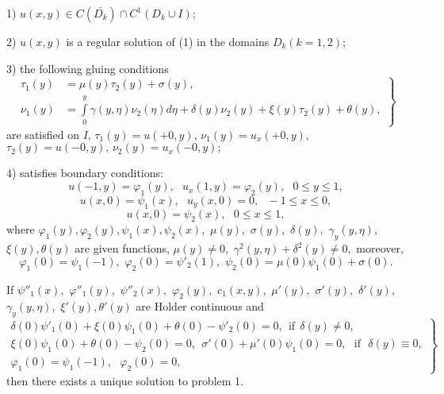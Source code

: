 \documentclass[12pt]{llncs}
\begin{document}
1) $u(x,y)\in C (\bar{D_{k}})\cap C^{1}(D_{k}\cup I)$;

2) $u(x,y)$ is a regular solution of (1) in the domains $D_{k}(k=1,2)$;

3) the following gluing conditions
\begin{equation}
\left.\begin{aligned}
\tau_{1}(y)&=\mu(y)\tau_{2}(y)+\sigma(y),\\
\nu_{1}(y)&=\int\limits_{0}^{y}\gamma(y,\eta)\nu_{2}(\eta)d\eta+\delta(y)\nu_{2}(y)+\xi(y)\tau_{2}(y)+\theta(y),
\end{aligned} \right\}
\end{equation}
are satisfied on $I$, $ \tau_{1}(y)=u(+0,y),\,
\nu_{1}(y)=u_{x}(+0,y), $
$\tau_{2}(y)=u(-0,y),\,\nu_{2}(y)=u_{x}(-0,y); $

4) satisfies boundary conditions:
\begin{equation}
u(-1,y)=\varphi_{1}(y), \ \ \ u_{x}(1,y)=\varphi_{2}(y),\ \ \ 0\leq y\leq 1,
\end{equation}
\begin{equation}
u(x,0)=\psi_{1}(x), \ \ \ u_{y}(x,0)=0,\ \ \ -1\leq x\leq 0,
\end{equation}
\begin{equation}
u(x,0)=\psi_{2}(x),  \ \ \ 0\leq x\leq 1,
\end{equation}
where $ \varphi _1 (y),\varphi _2 (y),\psi _1 (x),\psi _2 (x),$ $
\mu(y),$ $ \sigma(y),$
$  \delta(y),$ $ \gamma_{y}(y,\eta),$ $  \xi(y),  \theta(y) $ are given
functions, $\mu(y)\neq 0,$ $ \gamma^{2}(y,\eta)+\delta^{2}(y)\neq 0, $ moreover,
\begin{equation*}
\varphi_{1}(0)=\psi_{1}(-1), \,\,  \varphi_{2}(0)=\psi'_{2}(1),\,\,
\psi_{2}(0)=\mu(0)\psi_{1}(0)+\sigma(0).
\end{equation*}

\begin{theorem}
If $\psi''_{1}(x),$ $  \varphi''_{1}(y),$ $  \psi''_{2}(x),$ $ \varphi_{2}(y),$ $  c_{1}(x,y),$  $  \mu'(y),$ $  \sigma'(y),$ $  \delta'(y),$ $ \gamma_{y}(y,\eta),$ $  \xi'(y),  \theta'(y) $ are Holder continuous and 
\begin{equation}\left.\begin{aligned}
\delta(0)\psi'_{1}(0)+\xi(0)\psi_{1}(0)+\theta(0)-\psi'_{2}(0)=0,\ \ \text{if} \ \ \delta(y)\neq 0,\\
\xi(0)\psi_{1}(0)+\theta(0)-\psi_{2}(0)=0,\ \ \sigma'(0)+\mu'(0)\psi_{1}(0)=0,\ \ \  \text{if}\ \ \ \delta(y)\equiv 0,\\	\varphi_{1}(0)=\psi_{1}(-1),\ \ \ \varphi_{2}(0)=0,
\end{aligned} \right\}
\end{equation}
	then there exists a unique solution to problem 1.
\end{theorem}
\end{document}
